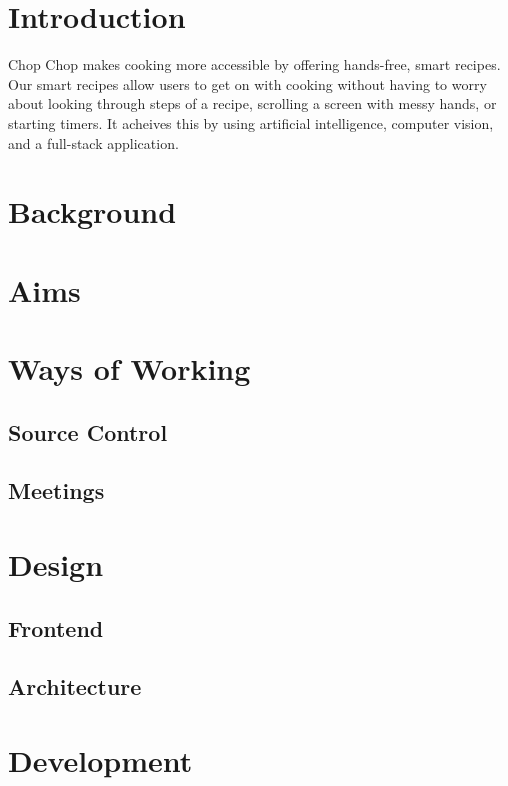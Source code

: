 \documentclass{article}
\begin{document}
  \begin{multicols}{2}

    \section{Introduction}
Chop Chop makes cooking more accessible by offering hands-free, smart recipes. Our smart recipes allow users to get on with cooking without having to worry about looking through steps of a recipe, scrolling a screen with messy hands, or starting timers. It acheives this by using artificial intelligence, computer vision, and a full-stack application.
    \lipsum[3-7]

    \section{Background}
    \lipsum[31-35]

    \section{Aims}
    \lipsum[7-11]

    \section{Ways of Working}
    \subsection{Source Control}
    \lipsum[11-13]
    \subsection{Meetings}
    \lipsum[13-15]

    \section{Design}
    \subsection{Frontend}
    \lipsum[15-17]
    \subsection{Architecture}
    \lipsum[17-19]

    \section{Development}

\end{multicols}
\end{document}
